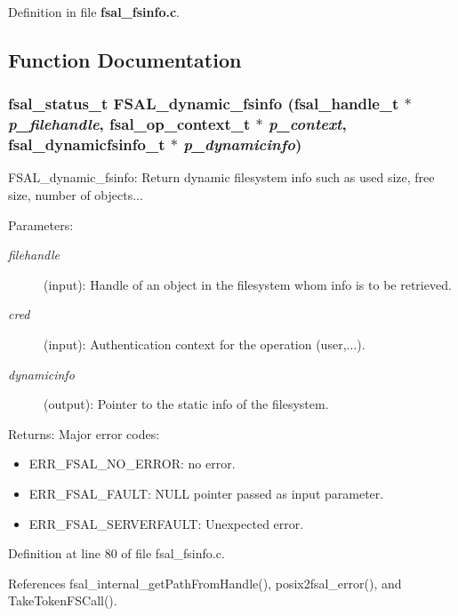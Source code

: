 Definition in file {\bf fsal\_\-fsinfo.c}.

\subsection{Function Documentation}
\subsubsection{\setlength{\rightskip}{0pt plus 5cm}fsal\_\-status\_\-t FSAL\_\-dynamic\_\-fsinfo (fsal\_\-handle\_\-t $\ast$ {\em p\_\-filehandle}, fsal\_\-op\_\-context\_\-t $\ast$ {\em p\_\-context}, fsal\_\-dynamicfsinfo\_\-t $\ast$ {\em p\_\-dynamicinfo})}\label{fsal__fsinfo_8c_a1}


FSAL\_\-dynamic\_\-fsinfo: Return dynamic filesystem info such as used size, free size, number of objects...

\begin{Desc}
\item[Parameters:]
\begin{description}
\item[{\em filehandle}](input): Handle of an object in the filesystem whom info is to be retrieved. \item[{\em cred}](input): Authentication context for the operation (user,...). \item[{\em dynamicinfo}](output): Pointer to the static info of the filesystem.\end{description}
\end{Desc}
\begin{Desc}
\item[Returns:]Major error codes:\begin{itemize}
\item ERR\_\-FSAL\_\-NO\_\-ERROR: no error.\item ERR\_\-FSAL\_\-FAULT: NULL pointer passed as input parameter.\item ERR\_\-FSAL\_\-SERVERFAULT: Unexpected error. \end{itemize}
\end{Desc}


Definition at line 80 of file fsal\_\-fsinfo.c.

References fsal\_\-internal\_\-get\-Path\-From\-Handle(), posix2fsal\_\-error(), and Take\-Token\-FSCall().
